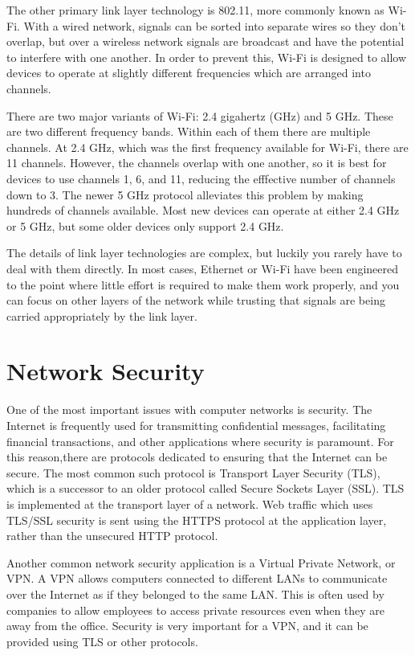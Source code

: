 The other primary link layer technology is 802.11, more commonly known as Wi-Fi. With a wired network, signals can be sorted into separate wires so they don't overlap, but over a wireless network signals are broadcast and have the potential to interfere with one another. In order to prevent this, Wi-Fi is designed to allow devices to operate at slightly different frequencies which are arranged into channels.

There are two major variants of Wi-Fi: 2.4 gigahertz (GHz) and 5 GHz. These are two different frequency bands. Within each of them there are multiple channels. At 2.4 GHz, which was the first frequency available for Wi-Fi, there are 11 channels. However, the channels overlap with one another, so it is best for devices to use channels 1, 6, and 11, reducing the efffective number of channels down to 3. The newer 5 GHz protocol alleviates this problem by making hundreds of channels available. Most new devices can operate at either 2.4 GHz or 5 GHz, but some older devices only support 2.4 GHz.

The details of link layer technologies are complex, but luckily you rarely have to deal with them directly. In most cases, Ethernet or Wi-Fi have been engineered to the point where little effort is required to make them work properly, and you can focus on other layers of the network while trusting that signals are being carried appropriately by the link layer.


\section{Network Security}\label{sec:network:security}

One of the most important issues with computer networks is security. The Internet is frequently used for transmitting confidential messages, facilitating financial transactions, and other applications where security is paramount. For this reason,there are protocols dedicated to ensuring that the Internet can be secure. The most common such protocol is Transport Layer Security (TLS), which is a successor to an older protocol called Secure Sockets Layer (SSL). TLS is implemented at the transport layer of a network. Web traffic which uses TLS/SSL security is sent using the HTTPS protocol at the application layer, rather than the unsecured HTTP protocol.

Another common network security application is a Virtual Private Network, or VPN. A VPN allows computers connected to different LANs to communicate over the Internet as if they belonged to the same LAN. This is often used by companies to allow employees to access private resources even when they are away from the office. Security is very important for a VPN, and it can be provided using TLS or other protocols.

